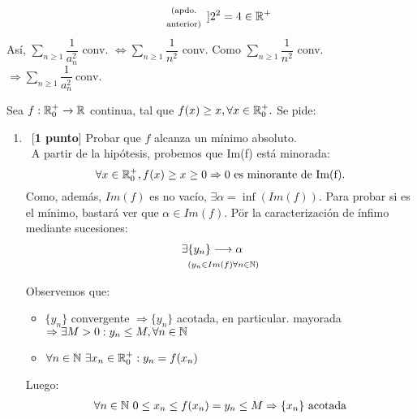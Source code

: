 \documentclass[12pt]{article}
\begin{document}
\begin{ejercicio}
\begin{enumerate}[label=\alph*)]
\begin{equation*}
\begin{array}{cc}
                     & \text{\scriptsize{(apdo.}} \\
                     & \text{\scriptsize{anterior)}}
                \end{array}]{} 2^2 = 4 \in {\mathbb{R}}^+
            \end{equation*}
            Así, $\displaystyle \sum\limits_{n \geq 1} \dfrac{1}{a_n^2}$ conv. $\Leftrightarrow \displaystyle \sum\limits_{n \geq 1} \dfrac{1}{n^2}$ conv. Como $\displaystyle \sum\limits_{n \geq 1} \dfrac{1}{n^2}$  conv. $\Rightarrow \boxed{\displaystyle \sum\limits_{n \geq 1} \dfrac{1}{a_n^2}\ \text{conv}.}$ \\
        \end{enumerate}
    \end{ejercicio}

    \begin{ejercicio}
        Sea $f: {\mathbb{R}}^+_0 \xrightarrow{} {\mathbb{R}}$ continua, tal que $f(x) \geq x, \forall x \in {\mathbb{R}}^+_0.$ Se pide:
        \begin{enumerate}[label=\alph*)]
            \item\ [\textbf{1 punto}] Probar que $f$ alcanza un mínimo absoluto. \\
            \  A partir de la hipótesis, probemos que Im(f) está minorada:
            \begin{equation*}
                \forall x \in {\mathbb{R}}_0^+, f(x) \geq x \geq 0 \Rightarrow 0 \text{ es minorante de Im(f)}. 
            \end{equation*}
            Como, además, $Im(f)$ es no vacío, $\exists \alpha = \inf(Im(f))$. Para probar si es el mínimo, bastará ver que $\alpha \in Im(f)$. Pör la caracterización de ínfimo mediante sucesiones:
            \begin{align*}
                \exists &\{ y_n\} \longrightarrow \alpha \\
                &^{(y_n \in Im(f) \forall n \in {\mathbb{N}})}
            \end{align*}
            Observemos que:
            \begin{itemize}
                \item $\{y_n\}$ convergente $\Rightarrow \{y_n\}$ acotada, en particular. mayorada $\Rightarrow \exists M > 0: y_n \leq M, \forall n \in {\mathbb{N}}$
                \item $\forall n \in {\mathbb{N}} \  \exists x_n \in {\mathbb{R}}_0^+: y_n = f(x_n)$
            \end{itemize}
            Luego:
            \begin{align*}
                \forall n \in \N \ 0 \leq x_n \leq f(x_n) = y_n \leq M \Rightarrow \{x_n\} \text{ acotada}

\end{align*}
\end{enumerate}
\end{ejercicio}
\end{document}
